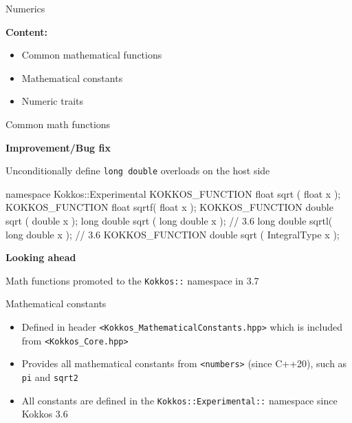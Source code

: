 

\begin{frame}[fragile]

  {\Huge Numerics}

  \vspace{10pt}

  \textbf{Content:}
  \begin{itemize}
    \item {Common mathematical functions}
    \item {Mathematical constants}
    \item {Numeric traits}
  \end{itemize}

  \vspace{-20pt}

\end{frame}


\begin{frame}[fragile]{Common math functions}

\textbf{Improvement/Bug fix}

Unconditionally define \texttt{long double} overloads on the host side

\begin{code}
namespace Kokkos::Experimental {
KOKKOS_FUNCTION float       sqrt ( float x );
KOKKOS_FUNCTION float       sqrtf( float x );
KOKKOS_FUNCTION double      sqrt ( double x );
                long double sqrt ( long double x ); // 3.6
                long double sqrtl( long double x ); // 3.6
KOKKOS_FUNCTION double      sqrt ( IntegralType x );
}
\end{code}

\vspace{10pt}

\textbf{Looking ahead}

Math functions promoted to the \texttt{Kokkos::} namespace in 3.7

\end{frame}


\begin{frame}[fragile]{Mathematical constants}

\begin{itemize}
  \item{Defined in header \texttt{<Kokkos\_MathematicalConstants.hpp>} which is included from \texttt{<Kokkos\_Core.hpp>}}
  \item{Provides all mathematical constants from \texttt{<numbers>} (since C++20), such as \texttt{pi} and \texttt{sqrt2}}
  \item{All constants are defined  in the \texttt{Kokkos::Experimental::} namespace since Kokkos 3.6}
\end{itemize}

\end{frame}

